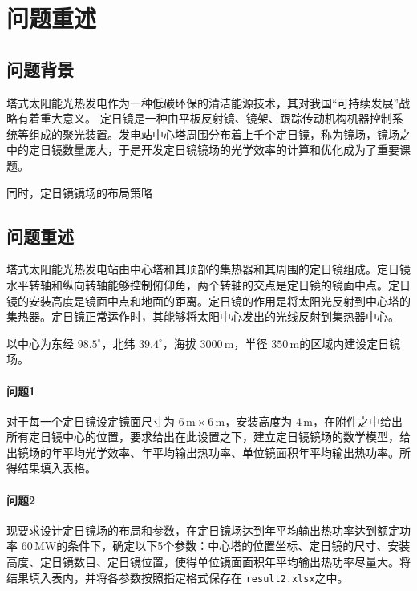 \section{问题重述}
\subsection{问题背景}
塔式太阳能光热发电作为一种低碳环保的清洁能源技术，其对我国``可持续发展''战略有着重大意义。
定日镜是一种由平板反射镜、镜架、跟踪传动机构机器控制系统等组成的聚光装置。发电站中心塔周围分布着上千个定日镜，称为镜场，镜场之中的定日镜数量庞大，于是开发定日镜镜场的光学效率的计算和优化成为了重要课题。

同时，定日镜镜场的布局策略
\subsection{问题重述}
塔式太阳能光热发电站由中心塔和其顶部的集热器和其周围的定日镜组成。定日镜水平转轴和纵向转轴能够控制俯仰角，两个转轴的交点是定日镜的镜面中点。定日镜的安装高度是镜面中点和地面的距离。定日镜的作用是将太阳光反射到中心塔的集热器。定日镜正常运作时，其能够将太阳中心发出的光线反射到集热器中心。

以中心为东经 \(98.5^\circ\)，北纬 \(39.4 ^\circ\)，海拔 \(3000\, \mathrm{m}\)，半径 \(350 \, \mathrm{m}\)的区域内建设定日镜场。
\paragraph{问题1}
对于每一个定日镜设定镜面尺寸为 \(6 \,\mathrm{m} \times 6 \, \mathrm{m}\)，安装高度为 \(4 \,\mathrm{m}\)，在附件之中给出所有定日镜中心的位置，要求给出在此设置之下，建立定日镜镜场的数学模型，给出镜场的年平均光学效率、年平均输出热功率、单位镜面积年平均输出热功率。所得结果填入表格。
\paragraph{问题2}
现要求设计定日镜场的布局和参数，在定日镜场达到年平均输出热功率达到额定功率 \(60 \, \mathrm{MW}\)的条件下，确定以下5个参数：中心塔的位置坐标、定日镜的尺寸、安装高度、定日镜数目、定日镜位置，使得单位镜面面积年平均输出热功率尽量大。将结果填入表内，并将各参数按照指定格式保存在 \texttt{result2.xlsx}之中。
